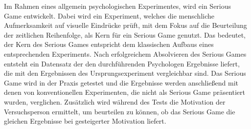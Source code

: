 Im Rahmen eines allgemein psychologischen Experimentes, wird ein Serious Game entwickelt. Dabei wird ein Experiment, welches die menschliche Aufmerksamkeit auf visuelle Eindrücke prüft, mit dem Fokus auf die Beurteilung der zeitlichen Reihenfolge, als Kern für ein Serious Game genutzt. Das bedeutet, der Kern des Serious Games entspricht dem klassischen Aufbaus eines entsprechenden Experiments. Nach erfolgreichem Absolvieren des Serious Games entsteht ein Datensatz der den durchführenden Psychologen Ergebnisse liefert, die mit den Ergebnissen des Ursprungsexperiment vergleichbar sind. Das Serious Game wird in der Praxis getestet und die Ergebnisse werden anschließend mit denen von konventionellen Experimenten, die nicht als Serious Game präsentiert wurden, verglichen. Zusätzlich wird während des Tests die Motivation der Versuchsperson ermittelt, um beurteilen zu können, ob das Serious Game die gleichen Ergebnisse bei gesteigerter Motivation liefert.

